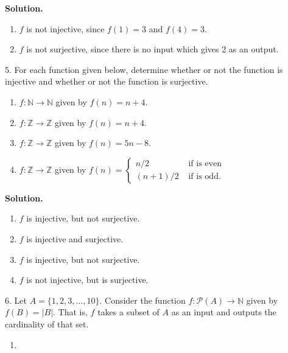 \documentclass[10pt,]{book}
\theoremstyle{plain}
\theoremstyle{definition}
\theoremstyle{definition}
\theoremstyle{definition}
\numberwithin{equation}{section}
\def\N{\mathbb N}
\def\Z{\mathbb Z}
\def\pow{\mathcal P}
\newcommand{\amp}{ & }
\begin{document}
\begin{exerciselist}
\noindent\textbf{Solution.}\hypertarget{solution-48}{}\quad
\leavevmode%
\begin{enumerate}[label=(\alph*)]
\item\hypertarget{li-305}{}\(f\) is not injective, since \(f(1) = 3\) and \(f(4) = 3\).\item\hypertarget{li-306}{}\(f\) is not surjective, since there is no input which gives 2 as an output.\end{enumerate}
\item[5.]\hypertarget{exercise-31}{}
For each function given below, determine whether or not the function is injective and whether or not the function is surjective.
%
\leavevmode%
\begin{enumerate}[label=(\alph*)]
\item\hypertarget{li-307}{}\(f:\N \to \N\) given by \(f(n) = n+4\).\item\hypertarget{li-308}{}\(f:\Z \to \Z\) given by \(f(n) = n+4\).\item\hypertarget{li-309}{}\(f:\Z \to \Z\) given by \(f(n) = 5n - 8\).\item\hypertarget{li-310}{}\(f:\Z \to \Z\) given by \(f(n) = \begin{cases}n/2 \amp  \mbox{ if  is even} \\
                                         (n+1)/2 \amp  \mbox{ if  is odd} .
\end{cases}\)\end{enumerate}
\par\smallskip
\par\smallskip
\noindent\textbf{Solution.}\hypertarget{solution-49}{}\quad
\leavevmode%
\begin{enumerate}[label=(\alph*)]
\item\hypertarget{li-311}{}\(f\) is injective, but not surjective.\item\hypertarget{li-312}{}\(f\) is injective and surjective.\item\hypertarget{li-313}{}\(f\) is injective, but not surjective.\item\hypertarget{li-314}{}\(f\) is not injective, but is surjective.\end{enumerate}
\item[6.]\hypertarget{exercise-32}{}
Let \(A = \{1,2,3,\ldots,10\}\). Consider the function \(f:\pow(A) \to \N\) given by \(f(B) = |B|\). That is, \(f\) takes a subset of \(A\) as an input and outputs the cardinality of that set.
%
\leavevmode%
\begin{enumerate}[label=(\alph*)]
\item\hypertarget{li-315}{}

\end{enumerate}
\end{exerciselist}
\end{document}

